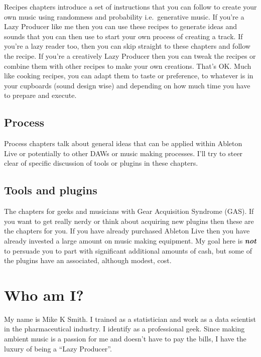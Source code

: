 \documentclass[
  12pt,
  letterpaper,
  oneside,
  open=any]{scrbook}
\begin{document}
Recipes chapters introduce a set of instructions that you can follow to
create your own music using randomness and probability i.e.~generative
music. If you're a Lazy Producer like me then you can use these recipes
to generate ideas and sounds that you can then use to start your own
process of creating a track. If you're a lazy reader too, then you can
skip straight to these chapters and follow the recipe. If you're a
creatively Lazy Producer then you can tweak the recipes or combine them
with other recipes to make your own creations. That's OK. Much like
cooking recipes, you can adapt them to taste or preference, to whatever
is in your cupboards (sound design wise) and depending on how much time
you have to prepare and execute.

\subsection*{Process}\label{process}

Process chapters talk about general ideas that can be applied within
Ableton Live or potentially to other DAWs or music making processes.
I'll try to steer clear of specific discussion of tools or plugins in
these chapters.

\subsection*{Tools and plugins}\label{tools-and-plugins}

The chapters for geeks and musicians with Gear Acquisition Syndrome
(GAS). If you want to get really nerdy or think about acquiring new
plugins then these are the chapters for you. If you have already
purchased Ableton Live then you have already invested a large amount on
music making equipment. My goal here is \textbf{\emph{not}} to persuade
you to part with significant additional amounts of cash, but some of the
plugins have an associated, although modest, cost.

\section*{Who am I?}\label{who-am-i}


My name is Mike K Smith. I trained as a statistician and work as a data
scientist in the pharmaceutical industry. I identify as a professional
geek. Since making ambient music is a passion for me and doesn't have to
pay the bills, I have the luxury of being a ``Lazy Producer''.
\end{document}
